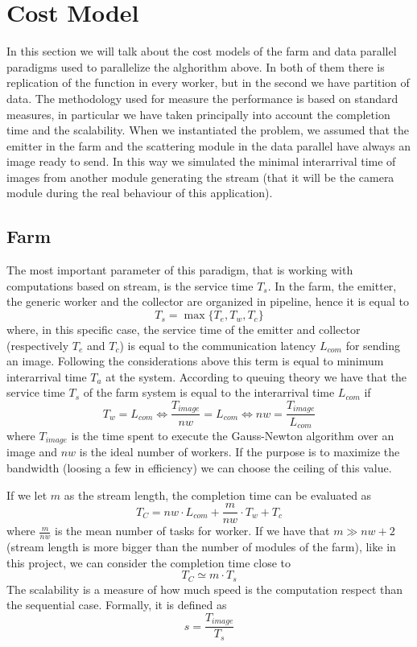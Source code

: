 \section{Cost Model}

In this section we will talk about the cost models of the farm and data parallel paradigms used to parallelize the alghorithm above. In both of them there is replication of the function in every worker, but in the second we have partition of data. The methodology used for measure the performance is based on standard measures, in particular we have taken principally into account the completion time and the scalability. When we instantiated the problem, we assumed that the emitter in the farm and the scattering module in the data parallel have always an image ready to send. In this way we simulated the minimal interarrival time of images from another module generating the stream (that it will be the camera module during the real behaviour of this application).

\subsection{Farm}

The most important parameter of this paradigm, that is working with computations based on stream, is the service time $T_{s}$. In the farm, the emitter, the generic worker and the collector are organized in pipeline, hence it is equal to
\[
T_{s} = \max \lbrace T_{e}, T_{w}, T_{c}\rbrace
\]
where, in this specific case, the service time of the emitter and collector (respectively $T_{e}$ and $T_{c}$) is equal to the communication latency $L_{com}$ for sending an image. Following the considerations above this term is equal to minimum interarrival time $T_{a}$ at the system. According to queuing theory we have that the service time $T_{s}$ of the farm system is equal to the interarrival time $L_{com}$ if
\[
T_{w} = L_{com} \Leftrightarrow \frac{T_{image}}{nw} = L_{com} \Leftrightarrow nw = \frac{T_{image}}{L_{com}} 
\]
where $T_{image}$ is the time spent to execute the Gauss-Newton algorithm over an image and $nw$ is the ideal number of workers. If the purpose is to maximize the bandwidth (loosing a few in efficiency) we can choose the ceiling of this value.

If we let $m$ as the stream length, the completion time can be evaluated as
\[
T_{C} = nw \cdot L_{com} + \frac{m}{nw} \cdot T_{w} + T_{c} 
\]
where $\frac{m}{nw}$ is the mean number of tasks for worker.
If we have that $m \gg nw+2$ (stream length is more bigger than the number of modules of the farm), like in this project, we can consider the completion time close to
\[
T_{C} \simeq m \cdot T_{s}
\]
The scalability is a measure of how much speed is the computation respect than the sequential case. Formally, it is defined as
\[
s = \frac{T_{image}}{T_{s}}
\]
